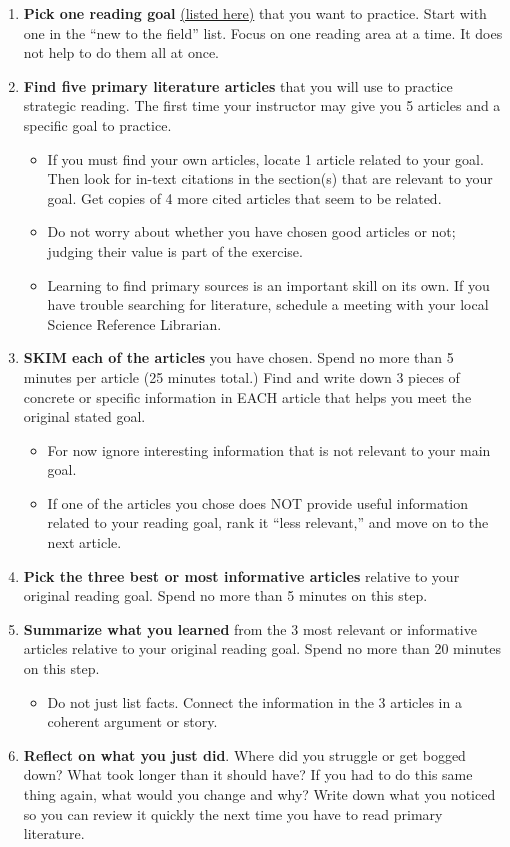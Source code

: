 \documentclass[
]{book}
\providecommand{\tightlist}{%
  \setlength{\itemsep}{0pt}\setlength{\parskip}{0pt}}
\begin{document}
\begin{enumerate}
\def\labelenumi{\arabic{enumi}.}
\item
  \textbf{Pick one reading goal} \protect\hyperlink{reading120}{(listed here)} that you want to practice. Start with one in the ``new to the field'' list. Focus on one reading area at a time. It does not help to do them all at once.
\item
  \textbf{Find five primary literature articles} that you will use to practice strategic reading. The first time your instructor may give you 5 articles and a specific goal to practice.

  \begin{itemize}
  \tightlist
  \item
    If you must find your own articles, locate 1 article related to your goal. Then look for in-text citations in the section(s) that are relevant to your goal. Get copies of 4 more cited articles that seem to be related.
  \item
    Do not worry about whether you have chosen good articles or not; judging their value is part of the exercise.
  \item
    Learning to find primary sources is an important skill on its own. If you have trouble searching for literature, schedule a meeting with your local Science Reference Librarian.
  \end{itemize}
\item
  \textbf{SKIM each of the articles} you have chosen. Spend no more than 5 minutes per article (25 minutes total.) Find and write down 3 pieces of concrete or specific information in EACH article that helps you meet the original stated goal.

  \begin{itemize}
  \tightlist
  \item
    For now ignore interesting information that is not relevant to your main goal.
  \item
    If one of the articles you chose does NOT provide useful information related to your reading goal, rank it ``less relevant,'' and move on to the next article.
  \end{itemize}
\item
  \textbf{Pick the three best or most informative articles} relative to your original reading goal. Spend no more than 5 minutes on this step.
\item
  \textbf{Summarize what you learned} from the 3 most relevant or informative articles relative to your original reading goal. Spend no more than 20 minutes on this step.

  \begin{itemize}
  \tightlist
  \item
    Do not just list facts. Connect the information in the 3 articles in a coherent argument or story.
  \end{itemize}
\item
  \textbf{Reflect on what you just did}. Where did you struggle or get bogged down? What took longer than it should have? If you had to do this same thing again, what would you change and why? Write down what you noticed so you can review it quickly the next time you have to read primary literature.
\end{enumerate}
\end{document}
